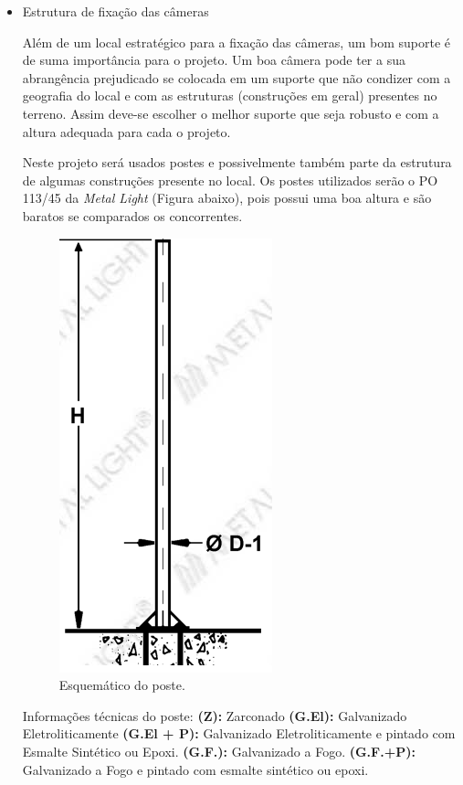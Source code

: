 \begin{itemize}
	\item Estrutura de fixação das câmeras
	
	Além de um local estratégico para a fixação das câmeras, um bom suporte é de suma importância para o projeto. Um boa câmera pode ter a sua abrangência prejudicado se colocada em um suporte que não condizer com a geografia do local e com as estruturas (construções em geral) presentes no terreno. Assim deve-se escolher o melhor suporte que seja robusto e com a altura adequada para cada o projeto. 
	
	Neste projeto será usados postes e possivelmente também parte da estrutura de algumas construções presente no local. Os postes utilizados serão o PO 113/45 da \textit{Metal Light} (Figura abaixo), pois possui uma boa altura e são baratos se comparados os concorrentes.
	
	\begin{figure}[H]
	 \centering
	\label{Esquemático do poste}
	 \includegraphics[keepaspectratio=true,scale=0.8]{monitoramento/26.png}
	 \caption{Esquemático do poste.}
	\end{figure}	
	
	
	Informações técnicas do poste:
	{\bf(Z):} Zarconado
	{\bf(G.El):} Galvanizado Eletroliticamente
	{\bf(G.El + P):} Galvanizado Eletroliticamente e pintado com Esmalte Sintético ou Epoxi.
	{\bf(G.F.):} Galvanizado a Fogo.
	{\bf(G.F.+P):} Galvanizado a Fogo e pintado com esmalte sintético ou epoxi.
	

\end{itemize}
